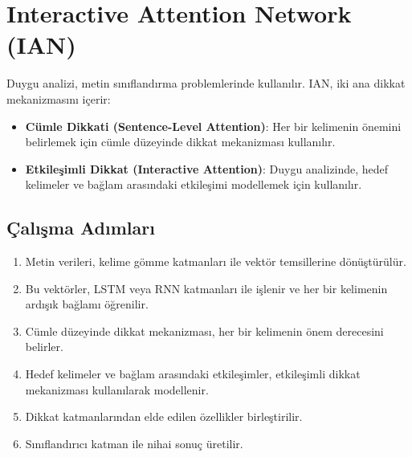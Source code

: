 \section{Interactive Attention Network (IAN)}
Duygu analizi, metin sınıflandırma problemlerinde kullanılır. IAN, iki ana dikkat mekanizmasını içerir:
\begin{itemize}
	\item \textbf{Cümle Dikkati (Sentence-Level Attention)}: Her bir kelimenin önemini belirlemek için cümle düzeyinde dikkat mekanizması kullanılır.
	\item \textbf{Etkileşimli Dikkat (Interactive Attention)}: Duygu analizinde, hedef kelimeler ve bağlam arasındaki etkileşimi modellemek için kullanılır.
\end{itemize}

\subsection{Çalışma Adımları}
\begin{enumerate}
	\item Metin verileri, kelime gömme katmanları ile vektör temsillerine dönüştürülür.
	\item Bu vektörler, LSTM veya RNN katmanları ile işlenir ve her bir kelimenin ardışık bağlamı öğrenilir.
	\item Cümle düzeyinde dikkat mekanizması, her bir kelimenin önem derecesini belirler.
	\item Hedef kelimeler ve bağlam arasındaki etkileşimler, etkileşimli dikkat mekanizması kullanılarak modellenir.
	\item Dikkat katmanlarından elde edilen özellikler birleştirilir.
	\item Sınıflandırıcı katman ile nihai sonuç üretilir.
\end{enumerate}

\newpage